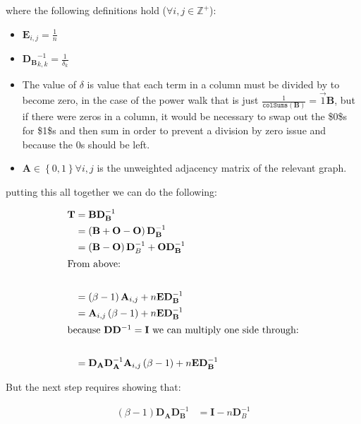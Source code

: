 \documentclass[11pt]{article}
\begin{document}
where the following definitions hold (\(\forall i, j \in \mathbb{Z}^+\)):

\begin{itemize}
\item \(\mathbf{E}_{i, j} = \frac{1}{n}\)
\item \(\mathbf{D_B}^{-1}_{k, k} = \frac{1}{\delta_k}\)
\item The value of \(\delta\) is value that each term in a column must be
divided by to become zero, in the case of the power walk that is just
\(\frac{1}{\mathtt{colSums}\left( \mathbf{B} \right)} = \vec{1}\mathbf{B}\),
but if there were zeros in a column, it would be necessary to swap out
the \$0\$s for \$1\$s and then sum in order to prevent a division by zero
issue and because the 0s should be left.
\item \(\mathbf{A}\in \left\{0, 1\right\} \forall i,j\) is the unweighted
adjacency matrix of the relevant graph.
\end{itemize}

putting this all together we can do the following:


\begin{align*}
\mathbf{T}&= \mathbf{B}\mathbf{D}^{- 1}_{\mathbf{B}} \\
&= \left( \mathbf{B}+  \mathbf{O} - \mathbf{O} \right) \mathbf{D}_{\mathbf{B}}^{- 1} \\
&= \left( \mathbf{B}- \mathbf{O} \right)\mathbf{D}_{B}^{- 1}  +  \mathbf{O} {\mathbf{D}_{\mathbf{B}}^{- 1}} \\
 \intertext{From above:} \\
&= \left( \beta- 1 \right) \mathbf{A}_{i,j} +  n \mathbf{E} \mathbf{D}_{\mathbf{B}}^{- 1}\\
&= \mathbf{A}_{i,j}\left( \beta- 1 \right)  +  n \mathbf{E} \mathbf{D}_{\mathbf{B}}^{- 1}\\
 \intertext{because $\mathbf{D} \mathbf{D}^{- 1} = \mathbf{I}$ we can multiply one side through:} \\
&= \mathbf{D}_{\mathbf{A}} \mathbf{D}_{\mathbf{A}}^{- 1}\mathbf{A}_{i,j}\left( \beta- 1 \right)  +  n \mathbf{E} \mathbf{D}_{\mathbf{B}}^{- 1}\\
\end{align*}


But the next step requires showing that:


\begin{align*}
\left( \beta-1 \right)\mathbf{D}_\mathbf{A} \mathbf{D}_{\mathbf{B}}^{- 1} &= \mathbf{I} - n \mathbf{D}_{B}^{- 1}
\end{align*}
\end{document}
